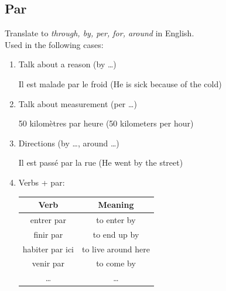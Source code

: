 \documentclass{book}
\begin{document}
        \subsection{Par}
            Translate to \textit{through, by, per, for, around} in English. \\
            Used in the following cases:
            \begin{enumerate}
                \item Talk about a reason (by \dots)
                    \begin{center}
                        Il est malade par le froid (He is sick because of the cold)
                    \end{center}
                \item Talk about measurement (per \dots)
                    \begin{center}
                        50 kilomètres par heure (50 kilometers per hour)
                    \end{center}
                \item Directions (by \dots, around \dots)
                    \begin{center}
                        Il est passé par la rue (He went by the street)
                    \end{center}
                \item Verbs + par:
                    \begin{center}
                        \begin{tabular}{|c|c|}
                            \hline
                            \textbf{Verb} & \textbf{Meaning}\\
                            \hline
                            entrer par & to enter by \\
                            finir par & to end up by \\
                            habiter par ici & to live around here \\
                            venir par & to come by \\
                            \dots & \dots \\
                            \hline
                        \end{tabular}
                    \end{center}
            \end{enumerate}
        
\end{document}
